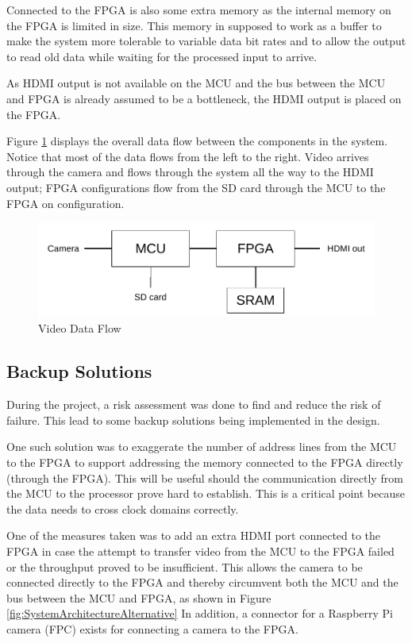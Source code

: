 Connected to the FPGA is also some extra memory as the internal memory on the FPGA is limited in size.
This memory in supposed to work as a buffer to make the system more tolerable to variable data bit rates and to allow the output to read old data while waiting for the processed input to arrive.

As HDMI output is not available on the MCU and the bus between the MCU and FPGA is already assumed to be a bottleneck, the HDMI output is placed on the FPGA.

Figure \ref{fig:SystemArchitecture} displays the overall data flow between the components in the system.
Notice that most of the data flows from the left to the right.
Video arrives through the camera and flows through the system all the way to the HDMI output;
FPGA configurations flow from the SD card through the MCU to the FPGA on configuration.

\begin{figure}
    \includegraphics{img/SystemArchitecture}
    \caption{Video Data Flow}
    \label{fig:SystemArchitecture}
\end{figure}

\subsection{Backup Solutions} \label{subsec:RiskAssessment}
During the project, a risk assessment was done to find and reduce the risk of failure.
This lead to some backup solutions being implemented in the design.

One such solution was to exaggerate the number of address lines from the MCU to the FPGA to support addressing the memory connected to the FPGA directly (through the FPGA).
This will be useful should the communication directly from the MCU to the processor prove hard to establish.
This is a critical point because the data needs to cross clock domains correctly.

One of the measures taken was to add an extra HDMI port connected to the FPGA in case the attempt to transfer video from the MCU to the FPGA failed or the throughput proved to be insufficient.
This allows the camera to be connected directly to the FPGA and thereby circumvent both the MCU and the bus between the MCU and FPGA, as shown in Figure \ref{fig:SystemArchitectureAlternative}
In addition, a connector for a Raspberry Pi camera (FPC) exists for connecting a camera to the FPGA.

